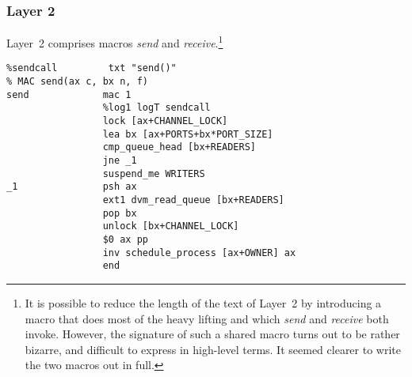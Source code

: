 \subsubsection{Layer 2}
Layer~2 comprises macros \emph{send} and \emph{receive}.\footnote{ It is possible to reduce the length of the text of Layer~2 by introducing a macro that does most of the heavy lifting and which \emph{send} and \emph{receive} both invoke. However, the signature of such a shared macro turns out to be rather bizarre, and difficult to express in high-level terms. It seemed clearer to write the two macros out in full.}

\begin{tabbing}
\indents
{}
\fin
\end{tabbing}

{\small
\begin{verbatim}
%sendcall         txt "send()"
% MAC send(ax c, bx n, f)
send             mac 1
                 %log1 logT sendcall
                 lock [ax+CHANNEL_LOCK]
                 lea bx [ax+PORTS+bx*PORT_SIZE]
                 cmp_queue_head [bx+READERS]
                 jne _1
                 suspend_me WRITERS
_1               psh ax
                 ext1 dvm_read_queue [bx+READERS]
                 pop bx
                 unlock [bx+CHANNEL_LOCK]
                 $0 ax pp
                 inv schedule_process [ax+OWNER] ax
                 end
\end{verbatim}}

\begin{tabbing}
\indents
{}
\fin
\end{tabbing}

